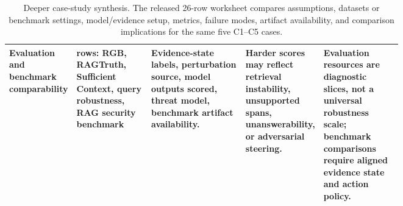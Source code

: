 \begin{table}[t]
\begin{tabularx}{\linewidth}{>{\raggedright\arraybackslash}p{0.14\linewidth}>{\raggedright\arraybackslash}p{0.19\linewidth}>{\raggedright\arraybackslash}p{0.24\linewidth}>{\raggedright\arraybackslash}p{0.18\linewidth}X}
Evaluation and benchmark comparability & 5 rows: RGB, RAGTruth, Sufficient Context, query robustness, RAG security benchmark & Evidence-state labels, perturbation source, model outputs scored, threat model, benchmark artifact availability. & Harder scores may reflect retrieval instability, unsupported spans, unanswerability, or adversarial steering. & Evaluation resources are diagnostic slices, not a universal robustness scale; benchmark comparisons require aligned evidence state and action policy. \\
\bottomrule
\end{tabularx}
\caption{Deeper case-study synthesis. The released 26-row worksheet compares assumptions, datasets or benchmark settings, model/evidence setup, metrics, failure modes, artifact availability, and comparison implications for the same five C1--C5 cases.}
\label{tab:deep-case-study-matrix}
\end{table}
